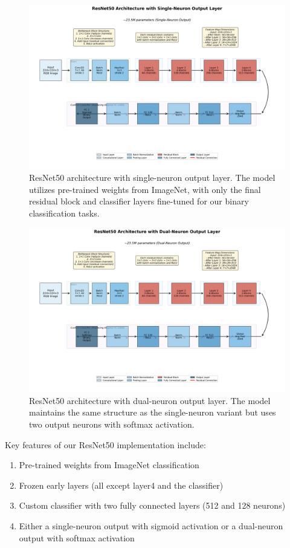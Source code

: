 \begin{figure}[htbp]
\centering
\includegraphics[width=\textwidth]{figures/resnet50_1neuron_architecture.png}
\caption{ResNet50 architecture with single-neuron output layer. The model utilizes pre-trained weights from ImageNet, with only the final residual block and classifier layers fine-tuned for our binary classification tasks.}
\label{fig:resnet50_arch_single}
\end{figure}

\begin{figure}[htbp]
\centering
\includegraphics[width=\textwidth]{figures/resnet50_2neuron_architecture.png}
\caption{ResNet50 architecture with dual-neuron output layer. The model maintains the same structure as the single-neuron variant but uses two output neurons with softmax activation.}
\label{fig:resnet50_arch_dual}
\end{figure}

Key features of our ResNet50 implementation include:
\begin{enumerate}
\item Pre-trained weights from ImageNet classification
\item Frozen early layers (all except layer4 and the classifier)
\item Custom classifier with two fully connected layers (512 and 128 neurons)
\item Either a single-neuron output with sigmoid activation or a dual-neuron output with softmax activation
\end{enumerate}

